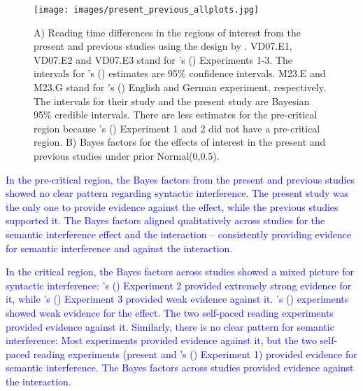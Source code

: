 \documentclass[a4paper, man, floatsintext]{apa7}
\begin{document}
{\begin{figure}
    \caption{A) Reading time differences in the regions of interest from the present and previous studies using the design by \textcite{vandyke07}. VD07.E1, VD07.E2 and VD07.E3 stand for \citeauthor{vandyke07}'s (\citeyear{vandyke07}) Experiments 1-3. The intervals for \citeauthor{vandyke07}'s (\citeyear{vandyke07}) estimates are 95\% confidence intervals. M23.E and M23.G stand for \citeauthor{mertzen}'s (\citeyear{mertzen}) English and German experiment, respectively. The intervals for their study and the present study are Bayesian 95\% credible intervals. There are less estimates for the pre-critical region because \citeauthor{vandyke07}'s (\citeyear{vandyke07}) Experiment 1 and 2 did not have a pre-critical region. B) Bayes factors for the effects of interest in the present and previous studies under prior Normal(0,0.5).}
    \label{fig:previous_vs_present}
    \centering
    \texttt{[image: images/present\_previous\_allplots.jpg]}
\end{figure}
\clearpage

\textcolor{blue}{In the pre-critical region, the Bayes factors from the present and previous studies showed no clear pattern regarding syntactic interference. The present study was the only one to provide evidence against the effect, while the previous studies supported it. The Bayes factors aligned qualitatively across studies for the semantic interference effect and the interaction -- consistently providing evidence for semantic interference and against the interaction.}

\textcolor{blue}{In the critical region, the Bayes factors across studies showed a mixed picture for syntactic interference: \citeauthor{vandyke07}'s (\citeyear{vandyke07}) Experiment 2 provided extremely strong evidence for it, while \citeauthor{vandyke07}'s (\citeyear{vandyke07}) Experiment 3 provided weak evidence against it. \citeauthor{mertzen}'s (\citeyear{mertzen}) experiments showed weak evidence for the effect. The two self-paced reading experiments provided evidence against it. Similarly, there is no clear pattern for semantic interference: Most experiments provided evidence against it, but the two self-paced reading experiments (present and \citeauthor{vandyke07}'s (\citeyear{vandyke07}) Experiment 1) provided evidence for semantic interference. The Bayes factors across studies provided evidence against the interaction.}

}
\end{document}
